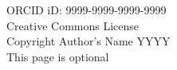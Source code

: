 \thispagestyle{plain}

\chapter*{}
\vspace*{\fill}
    \begin{center}
        \begin{singlespace}
            ORCID iD:  9999-9999-9999-9999\\
            Creative Commons License \\
            Copyright  Author's Name YYYY\\
            \vskip 0.2in
            This page is optional\\
    \end{singlespace}
    \end{center}
\vspace*{\fill}